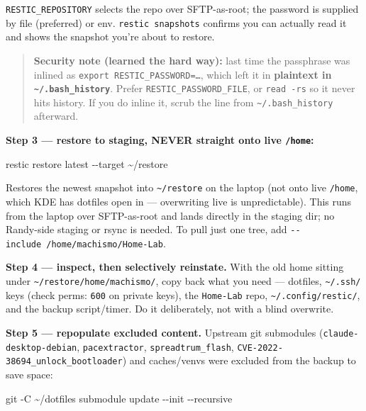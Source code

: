 \documentclass[
]{article}
\newenvironment{Shaded}{\begin{snugshade}}{\end{snugshade}}
\newcommand{\AttributeTok}[1]{\textcolor[rgb]{0.77,0.63,0.00}{#1}}
\newcommand{\ExtensionTok}[1]{#1}
\newcommand{\FunctionTok}[1]{\textcolor[rgb]{0.00,0.00,0.00}{#1}}
\newcommand{\NormalTok}[1]{#1}
\begin{document}
\texttt{RESTIC\_REPOSITORY} selects the repo over SFTP-as-root; the
password is supplied by file (preferred) or env.
\texttt{restic\ snapshots} confirms you can actually read it and shows
the snapshot you're about to restore.

\begin{quote}
\textbf{Security note (learned the hard way):} last time the passphrase
was inlined as
\texttt{export\ RESTIC\_PASSWORD=\textquotesingle{}…\textquotesingle{}},
which left it in \textbf{plaintext in
\texttt{\textasciitilde{}/.bash\_history}}. Prefer
\texttt{RESTIC\_PASSWORD\_FILE}, or \texttt{read\ -rs} so it never hits
history. If you do inline it, scrub the line from
\texttt{\textasciitilde{}/.bash\_history} afterward.
\end{quote}

\textbf{Step 3 --- restore to staging, NEVER straight onto live
\texttt{/home}:}

\begin{Shaded}
\begin{Highlighting}[]
\ExtensionTok{restic}\NormalTok{ restore latest }\AttributeTok{{-}{-}target}\NormalTok{ \textasciitilde{}/restore}
\end{Highlighting}
\end{Shaded}

Restores the newest snapshot into \texttt{\textasciitilde{}/restore} on
the laptop (not onto live \texttt{/home}, which KDE has dotfiles open in
--- overwriting live is unpredictable). This runs from the laptop over
SFTP-as-root and lands directly in the staging dir; no Randy-side
staging or rsync is needed. To pull just one tree, add
\texttt{-\/-include\ /home/machismo/Home-Lab}.

\textbf{Step 4 --- inspect, then selectively reinstate.} With the old
home sitting under \texttt{\textasciitilde{}/restore/home/machismo/},
copy back what you need --- dotfiles, \texttt{\textasciitilde{}/.ssh/}
keys (check perms: \texttt{600} on private keys), the \texttt{Home-Lab}
repo, \texttt{\textasciitilde{}/.config/restic/}, and the backup
script/timer. Do it deliberately, not with a blind overwrite.

\textbf{Step 5 --- repopulate excluded content.} Upstream git submodules
(\texttt{claude-desktop-debian}, \texttt{pacextractor},
\texttt{spreadtrum\_flash}, \texttt{CVE-2022-38694\_unlock\_bootloader})
and caches/venvs were excluded from the backup to save space:

\begin{Shaded}
\begin{Highlighting}[]
\FunctionTok{git} \AttributeTok{{-}C}\NormalTok{ \textasciitilde{}/dotfiles submodule update }\AttributeTok{{-}{-}init} \AttributeTok{{-}{-}recursive}
\end{Highlighting}
\end{Shaded}
\end{document}
